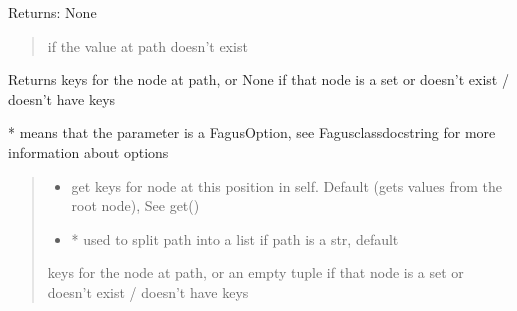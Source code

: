 \documentclass[a4paper,10pt,english]{sphinxmanual}
\begin{document}
\begin{fulllineitems}
\begin{fulllineitems}
\sphinxAtStartPar
Returns: None
\begin{quote}\begin{description}
\sphinxAtStartPar
{} \textendash{} if the value at path doesn’t exist

\end{description}\end{quote}

\end{fulllineitems}


\begin{fulllineitems}
\label{\detokenize{fagus.fagus:fagus.fagus.Fagus.keys}}
\pysigstartsignatures
{}
\pysigstopsignatures
\sphinxAtStartPar
Returns keys for the node at path, or None if that node is a set or doesn’t exist / doesn’t have keys

\sphinxAtStartPar
* means that the parameter is a FagusOption, see Fagus\sphinxhyphen{}class\sphinxhyphen{}docstring for more information about options
\begin{quote}\begin{description}
\begin{itemize}
\item {}
\sphinxAtStartPar
{} \textendash{} get keys for node at this position in self. Default  (gets values from the root node), See get()

\item {}
\sphinxAtStartPar
{} \textendash{} * used to split path into a list if path is a str, default 

\end{itemize}

\sphinxAtStartPar
keys for the node at path, or an empty tuple if that node is a set or doesn’t exist / doesn’t have keys


\end{description}
\end{quote}
\end{fulllineitems}
\end{fulllineitems}
\end{document}
